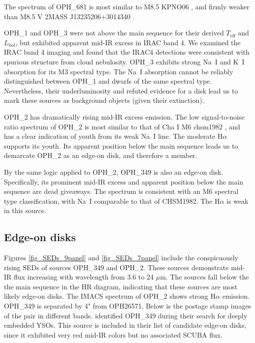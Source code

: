 \documentclass[12pt,preprint]{aastex}
\begin{document}
The spectrum of OPH\_681 is most similar to M8.5 KPNO06 \citep{1998AJ....115.2074B,2003ApJ...593.1093L}, and firmly weaker than M8.5 V 2MASS J13235206+3014340 \citep{2007AJ....133..439C}.  

OPH\_1 and OPH\_3 were not above the main sequence for their derived $T_{\mathrm{eff}}$ and $L_{\mathrm{bol}}$, but exhibited apparent mid-IR excess in IRAC band 4.  We examined the IRAC band 4 imaging and found that the IRAC4 detections were consistent with spurious structure from cloud nebulosity.  OPH\_3 exhibits strong Na~I and K~I absorption for its M3 spectral type.  The Na~I absorption cannot be reliably distinguished between OPH\_1 and dwarfs of the same spectral type.  Nevertheless, their underluminosity and refuted evidence for a disk lead us to mark these sources as background objects (given their extinction).

OPH\_2 has dramatically rising mid-IR excess emission.  The low signal-to-noise ratio spectrum of OPH\_2 is most similar to that of Cha I M6 chsm1982 \citep{2004ApJ...602..816L}, and has a clear indication of youth from its weak Na~I line.  The moderate H$\alpha$ supports its youth.  Its apparent position below the main sequence leads us to demarcate OPH\_2 as an edge-on disk, and therefore a member.

By the same logic applied to OPH\_2, OPH\_349 is also an edge-on disk.  Specifically, its prominent mid-IR excess and apparent position below the main sequence are dead giveaways.  The spectrum is consistent with an M6 spectral type classification, with Na~I comparable to that of CHSM1982.  The H$\alpha$ is weak in this source.

\subsection{Edge-on disks}
Figures \ref{fig_SEDs_9panel} and \ref{fig_SEDs_7panel} include the conspicuously rising SEDs of sources OPH\_349 and OPH\_2.  These sources demonstrate mid-IR flux increasing with wavelength from 3.6 to 24 $\mu$m.  The sources fall below the the main sequence in the HR diagram, indicating that these sources are most likely edge-on disks.  The IMACS spectrum of OPH\_2 shows strong H$\alpha$ emission.  OPH\_349 is separated by 4" from OPH26571.  Below is the postage stamp images of the pair in different bands.  \cite{2008ApJ...683..822J} identified OPH\_349 during their search for deeply embedded YSOs.  This source is included in their list of candidate edge-on disks, since it exhibited very red mid-IR colors but no associated SCUBA flux.
\end{document}
